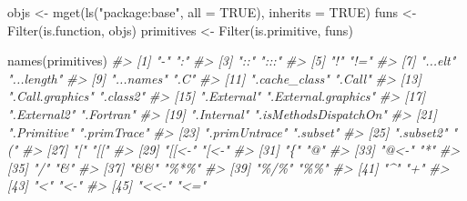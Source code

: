 \documentclass[
]{book}
\newenvironment{Shaded}{\begin{snugshade}}{\end{snugshade}}
\newcommand{\AttributeTok}[1]{\textcolor[rgb]{0.77,0.63,0.00}{#1}}
\newcommand{\CommentTok}[1]{\textcolor[rgb]{0.56,0.35,0.01}{\textit{#1}}}
\newcommand{\ConstantTok}[1]{\textcolor[rgb]{0.00,0.00,0.00}{#1}}
\newcommand{\FunctionTok}[1]{\textcolor[rgb]{0.00,0.00,0.00}{#1}}
\newcommand{\NormalTok}[1]{#1}
\newcommand{\OtherTok}[1]{\textcolor[rgb]{0.56,0.35,0.01}{#1}}
\newcommand{\StringTok}[1]{\textcolor[rgb]{0.31,0.60,0.02}{#1}}
\begin{document}
\begin{Shaded}
\begin{Highlighting}[]
\NormalTok{objs }\OtherTok{\textless{}{-}} \FunctionTok{mget}\NormalTok{(}\FunctionTok{ls}\NormalTok{(}\StringTok{"package:base"}\NormalTok{, }\AttributeTok{all =} \ConstantTok{TRUE}\NormalTok{), }\AttributeTok{inherits =} \ConstantTok{TRUE}\NormalTok{)}
\NormalTok{funs }\OtherTok{\textless{}{-}} \FunctionTok{Filter}\NormalTok{(is.function, objs)}
\NormalTok{primitives }\OtherTok{\textless{}{-}} \FunctionTok{Filter}\NormalTok{(is.primitive, funs)}

\FunctionTok{names}\NormalTok{(primitives)}
\CommentTok{\#\textgreater{}   [1] "{-}"                    ":"                   }
\CommentTok{\#\textgreater{}   [3] "::"                   ":::"                 }
\CommentTok{\#\textgreater{}   [5] "!"                    "!="                  }
\CommentTok{\#\textgreater{}   [7] "...elt"               "...length"           }
\CommentTok{\#\textgreater{}   [9] "...names"             ".C"                  }
\CommentTok{\#\textgreater{}  [11] ".cache\_class"         ".Call"               }
\CommentTok{\#\textgreater{}  [13] ".Call.graphics"       ".class2"             }
\CommentTok{\#\textgreater{}  [15] ".External"            ".External.graphics"  }
\CommentTok{\#\textgreater{}  [17] ".External2"           ".Fortran"            }
\CommentTok{\#\textgreater{}  [19] ".Internal"            ".isMethodsDispatchOn"}
\CommentTok{\#\textgreater{}  [21] ".Primitive"           ".primTrace"          }
\CommentTok{\#\textgreater{}  [23] ".primUntrace"         ".subset"             }
\CommentTok{\#\textgreater{}  [25] ".subset2"             "("                   }
\CommentTok{\#\textgreater{}  [27] "["                    "[["                  }
\CommentTok{\#\textgreater{}  [29] "[[\textless{}{-}"                 "[\textless{}{-}"                 }
\CommentTok{\#\textgreater{}  [31] "\{"                    "@"                   }
\CommentTok{\#\textgreater{}  [33] "@\textless{}{-}"                  "*"                   }
\CommentTok{\#\textgreater{}  [35] "/"                    "\&"                   }
\CommentTok{\#\textgreater{}  [37] "\&\&"                   "\%*\%"                 }
\CommentTok{\#\textgreater{}  [39] "\%/\%"                  "\%\%"                  }
\CommentTok{\#\textgreater{}  [41] "\^{}"                    "+"                   }
\CommentTok{\#\textgreater{}  [43] "\textless{}"                    "\textless{}{-}"                  }
\CommentTok{\#\textgreater{}  [45] "\textless{}\textless{}{-}"                  "\textless{}="                  }

\end{Highlighting}
\end{Shaded}
\end{document}
